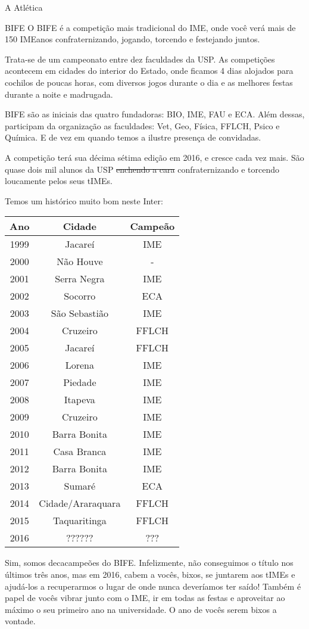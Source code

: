 \begin{secao}{A Atlética}
\begin{subsecao}{BIFE}
O BIFE é a competição mais tradicional do IME, onde você verá mais de 150
IMEanos confraternizando, jogando, torcendo e festejando juntos.

Trata-se de um campeonato entre dez faculdades da USP. As competições acontecem em cidades do interior do Estado, onde ficamos 4 dias
alojados para cochilos de poucas horas, com diversos jogos durante o dia e as
melhores festas durante a noite e madrugada.

BIFE são as iniciais das quatro fundadoras: BIO, IME, FAU e ECA.
Além dessas, participam da organização as faculdades: Vet, Geo, Física, FFLCH,
Psico e Química. E de vez em quando temos a ilustre presença de convidadas.

A competição terá sua décima sétima edição em 2016, e cresce cada vez mais. %
São quase dois mil alunos da USP \sout{enchendo a cara} confraternizando e
torcendo loucamente pelos seus tIMEs.

Temos um histórico muito bom neste Inter:
\begin{center}
	\begin{tabular}{c|c|c}
	  Ano & Cidade & Campeão\\
	  \hline
	  1999 & Jacareí & IME\\
	  2000 & Não Houve & - \\
	  2001 & Serra Negra & IME\\
	  2002 & Socorro & ECA\\
	  2003 & São Sebastião & IME\\
	  2004 & Cruzeiro & FFLCH\\
	  2005 & Jacareí & FFLCH\\
	  2006 & Lorena & IME\\
	  2007 & Piedade & IME\\
	  2008 & Itapeva & IME\\
	  2009 & Cruzeiro & IME\\
	  2010 & Barra Bonita & IME\\
	  2011 & Casa Branca & IME\\
	  2012 & Barra Bonita & IME\\
	  2013 & Sumaré & ECA\\
	  2014 & Cidade/Araraquara & FFLCH\\
	  2015 & Taquaritinga & FFLCH\\
	  2016 & ?????? & ???
	\end{tabular}
\end{center}

Sim, somos decacampeões do BIFE.  Infelizmente, não conseguimos o título nos
últimos três anos, mas em 2016, cabem a vocês, bixos, se juntarem aos tIMEs e
ajudá-los a recuperarmos o lugar de onde nunca deveríamos ter saído! Também é
papel de vocês vibrar junto com o IME, ir em todas as festas e aproveitar ao máximo o
seu primeiro ano na universidade. O ano de vocês serem bixos a vontade.


\end{subsecao}
\end{secao}
